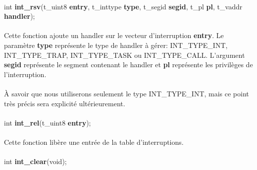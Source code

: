 \documentclass[10pt,a4wide]{article}
\begin{document}
\paragraph{}

\hspace{1.5cm}int \textbf{int\_rsv}(t\_uint8 \textbf{entry},
                                    t\_inttype \textbf{type},
                                    t\_segid \textbf{segid},
                                    t\_pl \textbf{pl},
                                    t\_vaddr \textbf{handler});

\paragraph{}

Cette fonction ajoute un handler sur le vecteur d'interruption \textbf{entry}.
Le param\`etre \textbf{type} repr\'esente le type de handler \`a g\'erer:
INT\_TYPE\_INT, INT\_TYPE\_TRAP, INT\_TYPE\_TASK ou INT\_TYPE\_CALL. L'argument
\textbf{segid} repr\'esente le segment contenant le handler et \textbf{pl}
repr\'esente les privil\`eges de l'interruption.

\paragraph{}

\`A savoir que nous utiliserons seulement le type INT\_TYPE\_INT, mais
ce point tr\`es pr\'ecis sera explicit\'e ult\'erieurement.

\paragraph{}

\hspace{1.5cm}int \textbf{int\_rel}(t\_uint8 \textbf{entry});

\paragraph{}

Cette fonction lib\`ere une entr\'ee de la table d'interruptions.

\paragraph{}

\hspace{1.5cm}int \textbf{int\_clear}(void);
\end{document}
